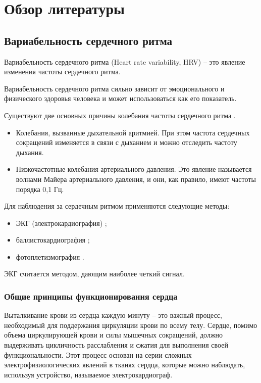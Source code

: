 \chapter{Обзор литературы}
\section{Вариабельность сердечного ритма }

Вариабельность сердечного ритма (Heart rate variability, HRV) -- это явление изменения частоты сердечного ритма.

Вариабельность сердечного ритма сильно зависит от эмоционального \cite{hrv_and_sensitivity, hrv_and_respiratory} и физического \cite{hrv_and_phisical_health} здоровья человека и может использоваться как его показатель.

Существуют две основных причины колебания частоты сердечного ритма \cite{two_rates_hrv}.

\begin{itemize}
	\item Колебания, вызванные дыхательной аритмией. При этом частота сердечных сокращений изменяется в связи с дыханием и можно отследить частоту дыхания.
	\item Низкочастотные колебания артериального давления. Это явление называется волнами Майера \cite{mayer_wave} артериального давления, и они, как правило, имеют частоты порядка 0,1 Гц.
\end{itemize}

Для наблюдения за сердечным ритмом применяются следующие методы:

\begin{itemize}
	\item ЭКГ (электрокардиография) \cite{EKG};
	\item баллистокардиография  \cite{Ballistocardiograms};
	\item фотоплетизмография \cite{Photoplethysmography}.
\end{itemize}

ЭКГ считается методом, дающим наиболее четкий сигнал.


\subsection{Общие принципы функционирования сердца}

Выталкивание крови из сердца каждую минуту -- это важный процесс, необходимый для поддержания циркуляции крови по всему телу. Сердце, помимо объема циркулирующей крови и силы мышечных сокращений, должно выдерживать цикличность расслабления и сжатия для выполнения своей функциональности. Этот процесс основан на серии сложных электрофизиологических явлений в тканях сердца, которые можно наблюдать, используя устройство, называемое электрокардиограф.
 
